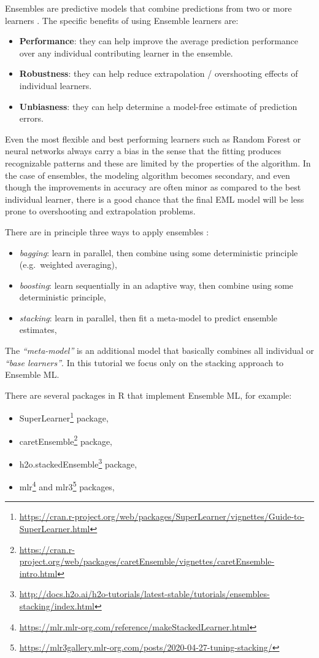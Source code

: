 \documentclass[
  graybox,natbib,nospthms]{svmono}
\providecommand{\tightlist}{%
  \setlength{\itemsep}{0pt}\setlength{\parskip}{0pt}}
\providecommand{\tightlist}{\setlength{\itemsep}{0pt}\setlength{\parskip}{0pt}}
\renewcommand{\href}[2]{#2 (\url{#1})}
\renewcommand{\href}[2]{#2\footnote{\url{#1}}}
\begin{document}
Ensembles are predictive models that combine predictions from two or more learners
\citep{seni2010ensemble, zhang2012ensemble}. The specific benefits of using Ensemble learners are:

\begin{itemize}
\tightlist
\item
  \textbf{Performance}: they can help improve the average prediction performance over any individual contributing learner in the ensemble.
\item
  \textbf{Robustness}: they can help reduce extrapolation / overshooting effects of individual learners.
\item
  \textbf{Unbiasness}: they can help determine a model-free estimate of prediction errors.
\end{itemize}

Even the most flexible and best performing learners such as Random Forest or neural
networks always carry a bias in the sense that the fitting produces recognizable
patterns and these are limited by the properties of the algorithm. In the case of
ensembles, the modeling algorithm becomes secondary, and even though the improvements
in accuracy are often minor as compared to the best individual learner, there is
a good chance that the final EML model will be less prone to overshooting and
extrapolation problems.

There are in principle three ways to apply ensembles \citep{zhang2012ensemble}:

\begin{itemize}
\tightlist
\item
  \emph{bagging}: learn in parallel, then combine using some deterministic principle (e.g.~weighted averaging),
\item
  \emph{boosting}: learn sequentially in an adaptive way, then combine using some deterministic principle,
\item
  \emph{stacking}: learn in parallel, then fit a meta-model to predict ensemble estimates,
\end{itemize}

The \emph{``meta-model''} is an additional model that basically combines all individual
or \emph{``base learners''}. In this tutorial we focus only on the stacking approach to Ensemble ML.

There are several packages in R that implement Ensemble ML, for example:

\begin{itemize}
\tightlist
\item
  \href{https://cran.r-project.org/web/packages/SuperLearner/vignettes/Guide-to-SuperLearner.html}{SuperLearner} package,
\item
  \href{https://cran.r-project.org/web/packages/caretEnsemble/vignettes/caretEnsemble-intro.html}{caretEnsemble} package,
\item
  \href{http://docs.h2o.ai/h2o-tutorials/latest-stable/tutorials/ensembles-stacking/index.html}{h2o.stackedEnsemble} package,
\item
  \href{https://mlr.mlr-org.com/reference/makeStackedLearner.html}{mlr} and \href{https://mlr3gallery.mlr-org.com/posts/2020-04-27-tuning-stacking/}{mlr3} packages,
\end{itemize}
\end{document}
